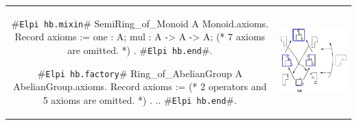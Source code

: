 \documentclass[a4paper,UKenglish,cleveref, autoref]{lipics-v2019}
\newcommand{\hbmixin}{{\tt\color{dkgreen}Elpi hb.mixin}}
\newcommand{\hbfactory}{{\tt\color{dkgreen}Elpi hb.factory}}
\newcommand{\hbend}{{\tt\color{dkgreen}Elpi hb.end}}
\theoremstyle{implem}
\theoremstyle{implem}
\theoremstyle{command}
\begin{document}
  \begin{tabular}{cc}
    \begin{minipage}{0.5 \textwidth}
      \begin{coqcode}
#\hbmixin{}# SemiRing_of_Monoid A Monoid.axioms.
  Record axioms := {
    one : A;
    mul : A -> A -> A;
    (* 7 axioms are omitted. *)
  }.
#\hbend{}#.

#\hbfactory{}# Ring_of_AbelianGroup A
    AbelianGroup.axioms.
  Record axioms := {
    (* 2 operators and 5 axioms are omitted. *)
  }.
  ..
#\hbend{}#.
      \end{coqcode}
    \end{minipage}
    &
  \begin{minipage}{0.4 \textwidth}
    \includegraphics[width=\textwidth]{v4.pdf}
  \end{minipage}
  \end{tabular}\\
\end{document}
